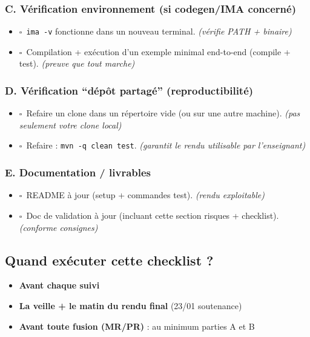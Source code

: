 \documentclass[11pt,a4paper]{article}
\newcommand{\checkbox}{\(\square\)}
\begin{document}
\subsubsection*{C. Vérification environnement (si codegen/IMA concerné)}
\begin{itemize}[leftmargin=*, itemsep=0.2em]
\item \checkbox\ \texttt{ima -v} fonctionne dans un nouveau terminal. \textit{(vérifie PATH + binaire)}
\item \checkbox\ Compilation + exécution d'un exemple minimal end-to-end (compile + test). \textit{(preuve que tout marche)}
\end{itemize}

\subsubsection*{D. Vérification ``dépôt partagé'' (reproductibilité)}
\begin{itemize}[leftmargin=*, itemsep=0.2em]
\item \checkbox\ Refaire un clone dans un répertoire vide (ou sur une autre machine). \textit{(pas seulement votre clone local)}
\item \checkbox\ Refaire : \texttt{mvn -q clean test}. \textit{(garantit le rendu utilisable par l'enseignant)}
\end{itemize}

\subsubsection*{E. Documentation / livrables}
\begin{itemize}[leftmargin=*, itemsep=0.2em]
\item \checkbox\ README à jour (setup + commandes test). \textit{(rendu exploitable)}
\item \checkbox\ Doc de validation à jour (incluant cette section risques + checklist). \textit{(conforme consignes)}
\end{itemize}

\subsection{Quand exécuter cette checklist ?}
\begin{itemize}[leftmargin=*]
\item \textbf{Avant chaque suivi}
\item \textbf{La veille + le matin du rendu final} (23/01 soutenance)
\item \textbf{Avant toute fusion (MR/PR)} : au minimum parties A et B
\end{itemize}
\end{document}
